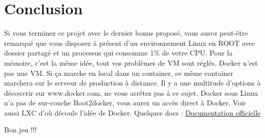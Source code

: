 \documentclass{42}
\begin{document}
	\newpage

\chapter{Conclusion}

Si vous terminez ce projet avec le dernier bonus proposé, vous aurez peut-être remarqué que vous disposez à présent d’un environnement Linux en ROOT avec dossier partagé et un processus qui consomme 1\% de votre CPU. Pour la mémoire, c’est la même idée, tout vos problèmes de VM sont réglés.
Docker n’est pas une VM.
Si ça marche en local dans un container, ce même container marchera sur le serveur de production à distance.
Il y a une multitude d’options à découvrir sur www.docker.com, ne vous arrêtez pas à ce sujet.
Docker sous Linux n’a pas de sur-couche Boot2docker, vous aurez un accès direct à Docker.
Voir aussi LXC d’où découle l'idée de Docker.
\newline
\newline
Quelques docs : \href{http://docs.docker.com}{Documentation officielle}

Bon jeu !!!

\end{document}
